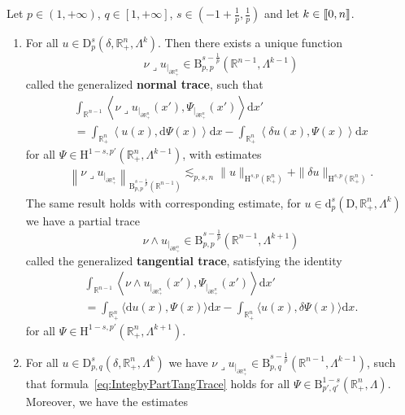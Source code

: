 \documentclass[AHL,Unicode,longabstracts,published]{cedram}
\newcommand{\bbR}{\mathbb{R}}
\newcommand{\rmH}{\mathrm{H}}%
\newcommand{\rmB}{\mathrm{B}}
\newcommand{\rmd}{\mathrm{d}}
\newcommand{\rmD}{\mathrm{D}}
\newcommand{\llbracket}{\mathopen{[\mkern -2.7mu[}}
\newcommand{\rrbracket}{\mathclose{]\mkern -2.7mu]}}
\newcommand{\llb}{\llbracket}
\newcommand{\rrb}{\rrbracket}
\newcommand{\iprod}{\mathbin{\lrcorner}}
\newcommand*{\romanenumi}{\renewcommand*{\theenumi}{\roman{enumi}}}
\begin{document}
\begin{theo}\label{thm:TracesDifferentialformsInhomSpaces}
Let $p\in(1,+\infty)$, $q\in[1,+\infty]$, $s\in(-1+\frac{1}{p},\frac{1}{p})$ and let $k\in\llb 0,n\rrb$.
\begin{enumerate}\romanenumi
\item\label{theoA.1.1} For all $u\in{\rmD}^{s}_{p}(\delta,\bbR^{n}_+,\Lambda^k)$. Then there exists a unique function
\[
\nu\iprod u_{|_{\partial\bbR^n_+}}\in \rmB^{s-\frac{1}{p}}_{p,p}\left(\bbR^{n-1},\Lambda^{k-1}\right)
\]
called the generalized \textbf{normal trace}, such that
\begin{multline}\label{eq:IntegbyPartTangTrace}
\int_{\bbR^{n-1}}\left\langle \nu\iprod u_{|_{\partial\bbR^n_+}}(x'), {\Psi}_{|_{\partial\bbR^n_+}}(x') \right\rangle\rmd x' \\
= \int_{\bbR^{n}_+} \left\langle u(x), \rmd {\Psi}(x)\right\rangle\rmd x- \int_{\bbR^{n}_+}\left\langle \delta u(x), {\Psi}(x)\right\rangle\rmd x 
\end{multline}
for all $\Psi\in \rmH^{1-s,p'}(\bbR^n_+, \Lambda^{k-1})$, with estimates
\begin{align*}
\left\|\nu\iprod u_{|_{\partial\bbR^n_+}} \right\|_{\rmB^{s-\frac{1}{p}}_{p,p}\left(\bbR^{n-1}\right)}\lesssim_{p,s,n} \| u \|_{{\rmH}^{s,p}\left(\bbR^n_+\right)} + \| \delta u \|_{{\rmH}^{s,p}\left(\bbR^n_+\right)} .
\end{align*}
The same result holds with corresponding estimate, for $u\in {\rmd}^{s}_{p}(\rmD,\bbR^{n}_+,\Lambda^k)$ we have a partial trace
\[
\nu\wedge u_{|_{\partial\bbR^n_+}}\in \rmB^{s-\frac{1}{p}}_{p,p}\left(\bbR^{n-1},\Lambda^{k+1}\right)
\]
called the generalized \textbf{tangential trace}, satisfying the identity
\begin{multline}\label{eq:IntegbyPartNormTrace}
\int_{\bbR^{n-1}}\left\langle \nu\wedge u_{|_{\partial\bbR^n_+}}(x'), {\Psi}_{|_{\partial\bbR^n_+}} (x') \right\rangle \rmd x' \\
= \int_{\bbR^{n}_+} \langle \rmd u(x), {\Psi}(x)\rangle\rmd x - \int_{\bbR^{n}_+} \langle u(x), \delta {\Psi}(x)\rangle\rmd x . 
\end{multline}
for all $\Psi\in \rmH^{1-s,p'}(\bbR^n_+, \Lambda^{k+1})$.
\item\label{theoA.1.2} For all $u\in{\rmD}^{s}_{p,q}(\delta,\bbR^{n}_+,\Lambda^k)$ we have $\nu\iprod u_{|_{\partial\bbR^n_+}}\in \rmB^{s-\frac{1}{p}}_{p,q}(\bbR^{n-1},\Lambda^{k-1})$, such that formula~\eqref{eq:IntegbyPartTangTrace} holds for all $\Psi\in \rmB^{1-s}_{p',q'}(\bbR^n_+, \Lambda)$. Moreover, we have the estimates

\end{enumerate}
\end{theo}
\end{document}
